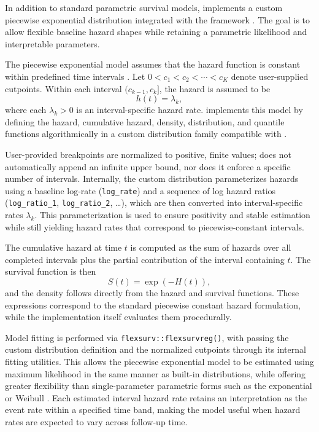 In addition to standard parametric survival models,  implements a custom piecewise exponential distribution integrated with the  framework \citep{Jackson:2016aa}. The goal is to allow flexible baseline hazard shapes while retaining a parametric likelihood and interpretable parameters.

The piecewise exponential model assumes that the hazard function is constant within predefined time intervals \citep{Friedman:1982aa}. Let \(0 < c_1 < c_2 < \cdots < c_K\) denote user-supplied cutpoints. Within each interval \((c_{k-1}, c_k]\), the hazard is assumed to be
\begin{equation}
  h(t) = \lambda_{k},
\end{equation}
where each \(\lambda_k > 0\) is an interval-specific hazard rate.  implements this model by defining the hazard, cumulative hazard, density, distribution, and quantile functions algorithmically in a custom distribution family compatible with .

User-provided breakpoints are normalized to positive, finite values;  does not automatically append an infinite upper bound, nor does it enforce a specific number of intervals. Internally, the custom distribution parameterizes hazards using a baseline log-rate (\texttt{log\_rate}) and a sequence of log hazard ratios (\texttt{log\_ratio\_1}, \texttt{log\_ratio\_2}, \ldots), which are then converted into interval-specific rates \(\lambda_k\). This parameterization is used to ensure positivity and stable estimation while still yielding hazard rates that correspond to piecewise-constant intervals.

The cumulative hazard at time \(t\) is computed as the sum of hazards over all completed intervals plus the partial contribution of the interval containing \(t\). The survival function is then
\begin{equation}
  S(t) = \exp(-H(t)),
\end{equation}
and the density follows directly from the hazard and survival functions. These expressions correspond to the standard piecewise constant hazard formulation, while the implementation itself evaluates them procedurally.

Model fitting is performed via \texttt{flexsurv::flexsurvreg()}, with  passing the custom distribution definition and the normalized cutpoints through its internal fitting utilities. This allows the piecewise exponential model to be estimated using maximum likelihood in the same manner as built-in  distributions, while offering greater flexibility than single-parameter parametric forms such as the exponential or Weibull \citep{Lawless:2003aa}. Each estimated interval hazard rate retains an interpretation as the event rate within a specified time band, making the model useful when hazard rates are expected to vary across follow-up time.


